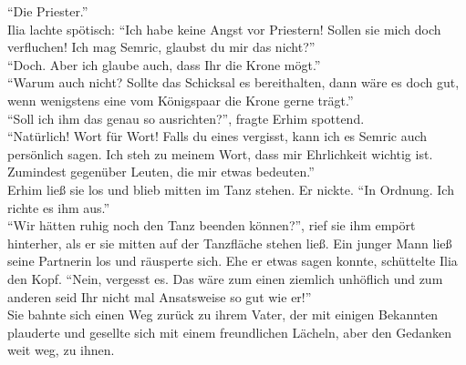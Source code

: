 ``Die Priester.''\\
Ilia lachte spötisch: ``Ich habe keine Angst vor Priestern! Sollen sie mich doch verfluchen! Ich 
mag Semric, glaubst du mir das nicht?''\\
``Doch. Aber ich glaube auch, dass Ihr die Krone mögt.''\\
``Warum auch nicht? Sollte das Schicksal es bereithalten, dann wäre es doch gut, wenn wenigstens 
eine vom Königspaar die Krone gerne trägt.''\\
``Soll ich ihm das genau so ausrichten?'', fragte Erhim spottend.\\
``Natürlich! Wort für Wort! Falls du eines vergisst, kann ich es Semric auch persönlich sagen. Ich 
steh zu meinem Wort, dass mir Ehrlichkeit wichtig ist. Zumindest gegenüber Leuten, die mir etwas 
bedeuten.''\\
Erhim ließ sie los und blieb mitten im Tanz stehen. Er nickte. ``In Ordnung. Ich richte es ihm 
aus.''\\
``Wir hätten ruhig noch den Tanz beenden können?'', rief sie ihm empört hinterher, als er sie 
mitten auf der Tanzfläche stehen ließ. Ein junger Mann ließ seine Partnerin los und räusperte sich. 
Ehe er etwas sagen konnte, schüttelte Ilia den Kopf. ``Nein, vergesst es. Das wäre zum einen 
ziemlich unhöflich und zum anderen seid Ihr nicht mal Ansatsweise so gut wie er!''\\
Sie bahnte sich einen Weg zurück zu ihrem Vater, der mit einigen Bekannten plauderte und gesellte 
sich mit einem freundlichen Lächeln, aber den Gedanken weit weg, zu ihnen.\\

